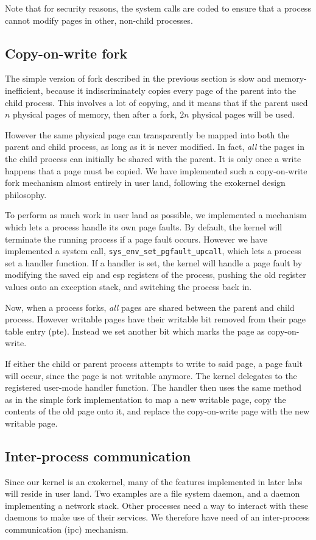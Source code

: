 \documentclass{article}
\begin{document}
Note that for security reasons, the system calls are coded to ensure that a
process cannot modify pages in other, non-child processes.


\subsection{Copy-on-write fork}
The simple version of fork described in the previous section is slow and
memory-inefficient, because it indiscriminately copies every page of the
parent into the child process. This involves a lot of copying, and it means
that if the parent used $n$ physical pages of memory, then after a fork, $2n$
physical pages will be used.

However the same physical page can transparently be mapped into both the
parent and child process, as long as it is never modified. In fact, \emph{all}
the pages in the child process can initially be shared with the parent. It is
only once a write happens that a page must be copied. We have implemented such
a copy-on-write fork mechanism almost entirely in user land, following the
exokernel design philosophy.

To perform as much work in user land as possible, we implemented a mechanism
which lets a process handle its own page faults. By default, the kernel will
terminate the running process if a page fault occurs. However we have
implemented a system call, \texttt{sys\_env\_set\_pgfault\_upcall}, which lets
a process set a handler function. If a handler is set, the kernel will handle
a page fault by modifying the saved \gls{eip} and \gls{esp} registers of the
process, pushing the old register values onto an exception stack, and
switching the process back in.

Now, when a process forks, \emph{all} pages are shared between the parent and
child process. However writable pages have their writable bit removed from
their page table entry (\gls{pte}). Instead we set another bit which marks the
page as copy-on-write.

If either the child or parent process attempts to write to said page, a page
fault will occur, since the page is not writable anymore. The kernel delegates
to the registered user-mode handler function. The handler then uses the same
method as in the simple fork implementation to map a new writable page, copy
the contents of the old page onto it, and replace the copy-on-write page with
the new writable page.


\subsection{Inter-process communication}
Since our kernel is an exokernel, many of the features implemented in later
labs will reside in user land. Two examples are a file system daemon, and a
daemon implementing a network stack. Other processes need a way to interact
with these daemons to make use of their services. We therefore have need of an
inter-process communication (\gls{ipc}) mechanism.
\end{document}
